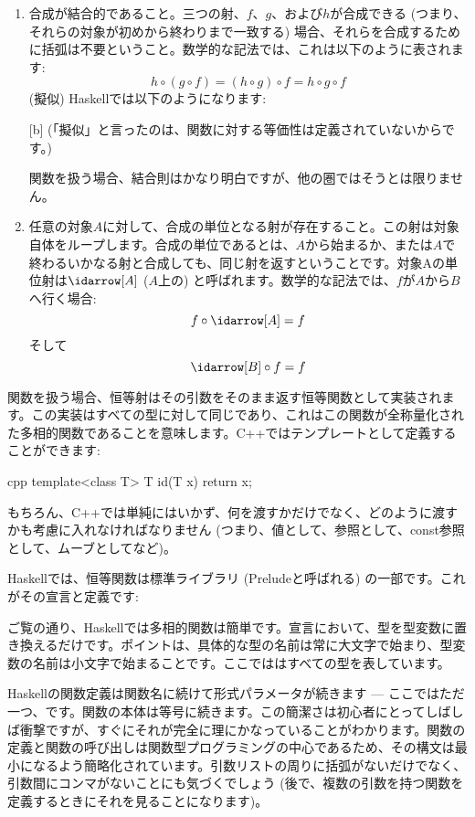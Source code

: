 \begin{enumerate}
  \item
        合成が結合的であること。三つの射、$f$、$g$、および$h$が合成できる (つまり、それらの対象が初めから終わりまで一致する) 場合、それらを合成するために括弧は不要ということ。数学的な記法では、これは以下のように表されます:
        \[h \circ (g \circ f) = (h \circ g) \circ f = h \circ g \circ f\]
        (擬似) Haskellでは以下のようになります:

        [b]
        (「擬似」と言ったのは、関数に対する等価性は定義されていないからです。)

        関数を扱う場合、結合則はかなり明白ですが、他の圏ではそうとは限りません。

  \item
        任意の対象$A$に対して、合成の単位となる射が存在すること。この射は対象自体をループします。合成の単位であるとは、$A$から始まるか、または$A$で終わるいかなる射と合成しても、同じ射を返すということです。対象Aの単位射は$\idarrow[A]$ ($A$上の) と呼ばれます。数学的な記法では、$f$が$A$から$B$へ行く場合:
        \[f \circ \idarrow[A] = f\]
        そして
        \[\idarrow[B] \circ f = f\]
\end{enumerate}
関数を扱う場合、恒等射はその引数をそのまま返す恒等関数として実装されます。この実装はすべての型に対して同じであり、これはこの関数が全称量化された多相的関数であることを意味します。C++ではテンプレートとして定義することができます:

\begin{snip}{cpp}
template<class T> T id(T x) { return x; }
\end{snip}
もちろん、C++では単純にはいかず、何を渡すかだけでなく、どのように渡すかも考慮に入れなければなりません (つまり、値として、参照として、const参照として、ムーブとしてなど)。

Haskellでは、恒等関数は標準ライブラリ (Preludeと呼ばれる) の一部です。これがその宣言と定義です:

ご覧の通り、Haskellでは多相的関数は簡単です。宣言において、型を型変数に置き換えるだけです。ポイントは、具体的な型の名前は常に大文字で始まり、型変数の名前は小文字で始まることです。ここでははすべての型を表しています。

Haskellの関数定義は関数名に続けて形式パラメータが続きます --- ここではただ一つ、です。関数の本体は等号に続きます。この簡潔さは初心者にとってしばしば衝撃ですが、すぐにそれが完全に理にかなっていることがわかります。関数の定義と関数の呼び出しは関数型プログラミングの中心であるため、その構文は最小になるよう簡略化されています。引数リストの周りに括弧がないだけでなく、引数間にコンマがないことにも気づくでしょう (後で、複数の引数を持つ関数を定義するときにそれを見ることになります)。

